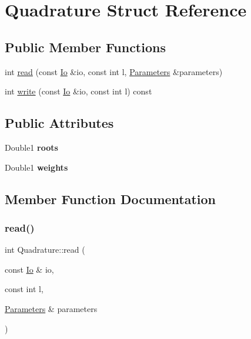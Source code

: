 \hypertarget{structQuadrature}{}\section{Quadrature Struct Reference}
\label{structQuadrature}
\subsection*{Public Member Functions}
\begin{DoxyCompactItemize}
\item 
int \mbox{\hyperlink{structQuadrature_a8a5353ea2b41c9ca21ba6c48e019678c}{read}} (const \mbox{\hyperlink{structIo}{Io}} \&io, const int l, \mbox{\hyperlink{classParameters}{Parameters}} \&parameters)
\item 
int \mbox{\hyperlink{structQuadrature_ae7cd1922b845cdb79ad3bbf89e4e2c81}{write}} (const \mbox{\hyperlink{structIo}{Io}} \&io, const int l) const
\end{DoxyCompactItemize}
\subsection*{Public Attributes}
\begin{DoxyCompactItemize}
\item 
\mbox{\label{structQuadrature_ab8bb181e2754ed8b1098e19b7de45d26}} 
Double1 {\bfseries roots}
\item 
\mbox{\label{structQuadrature_a4eabe98a84a5757b08beda3604cb9ab8}} 
Double1 {\bfseries weights}
\end{DoxyCompactItemize}


\subsection{Member Function Documentation}
\mbox{\label{structQuadrature_a8a5353ea2b41c9ca21ba6c48e019678c}} 
\subsubsection{\texorpdfstring{read()}{read()}}
{\footnotesize\ttfamily int Quadrature\+::read (\begin{DoxyParamCaption}\item[{const \mbox{\hyperlink{structIo}{Io}} \&}]{io,  }\item[{const int}]{l,  }\item[{\mbox{\hyperlink{classParameters}{Parameters}} \&}]{parameters }\end{DoxyParamCaption})}

